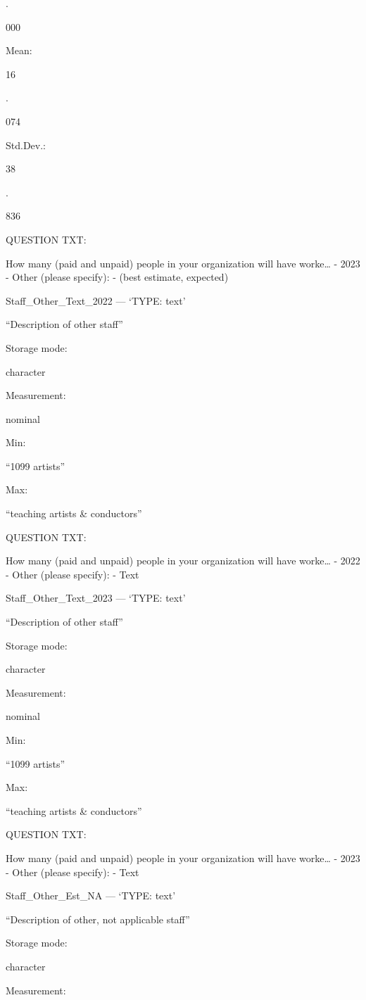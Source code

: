 \documentclass[
  letterpaper,
]{scrbook}
\begin{document}
.

000

Mean:

16

.

074

Std.Dev.:

38

.

836

QUESTION TXT:

How many (paid and unpaid) people in your organization will have
worke\ldots{} - 2023 - Other (please specify): - (best estimate,
expected)

Staff\_Other\_Text\_2022 --- {`TYPE: text'}

``Description of other staff''

Storage mode:

character

Measurement:

nominal

Min:

``1099 artists''

Max:

``teaching artists \& conductors''

QUESTION TXT:

How many (paid and unpaid) people in your organization will have
worke\ldots{} - 2022 - Other (please specify): - Text

Staff\_Other\_Text\_2023 --- {`TYPE: text'}

``Description of other staff''

Storage mode:

character

Measurement:

nominal

Min:

``1099 artists''

Max:

``teaching artists \& conductors''

QUESTION TXT:

How many (paid and unpaid) people in your organization will have
worke\ldots{} - 2023 - Other (please specify): - Text

Staff\_Other\_Est\_NA --- {`TYPE: text'}

``Description of other, not applicable staff''

Storage mode:

character

Measurement:
\end{document}
